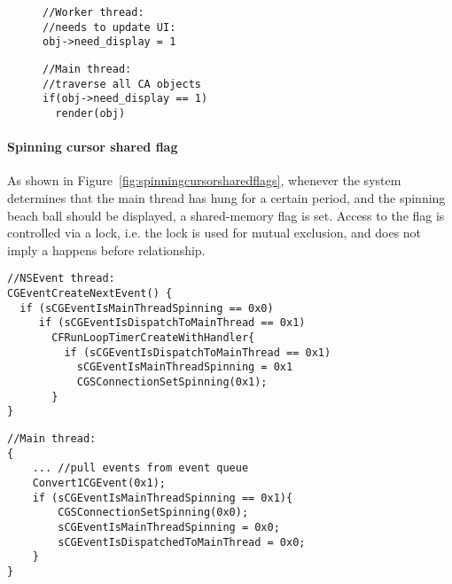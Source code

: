 \begin{figure}[ht!]
\begin{minipage}[t]{.20\textwidth}
\begin{lstlisting}
//Worker thread:
//needs to update UI:
obj->need_display = 1
\end{lstlisting}\hfill
\end{minipage}
\noindent\begin{minipage}[t]{.28\textwidth}
\begin{lstlisting}
//Main thread: 
//traverse all CA objects
if(obj->need_display == 1)
  render(obj)
\end{lstlisting}\hfill
\end{minipage}
    \label{fig:casharedflag}
\end{figure}

\paragraph{Spinning cursor shared flag}
As shown in Figure~\ref{fig:spinningcursorsharedflags},
whenever the system determines that the main thread has hung for a certain
period, and the spinning beach ball should be displayed, a shared-memory flag
is set. Access to the flag is controlled via a lock, i.e. the lock is used for
mutual exclusion, and does not imply a happens before relationship.

\begin{figure*}[ht!]
\begin{minipage}[t]{0.5\textwidth}
\begin{lstlisting}
//NSEvent thread:
CGEventCreateNextEvent() {
  if (sCGEventIsMainThreadSpinning == 0x0)
     if (sCGEventIsDispatchToMainThread == 0x1)
       CFRunLoopTimerCreateWithHandler{
         if (sCGEventIsDispatchToMainThread == 0x1)
           sCGEventIsMainThreadSpinning = 0x1
           CGSConnectionSetSpinning(0x1);
       }
}
\end{lstlisting}
\end{minipage}
\begin{minipage}[t]{0.4\textwidth}
\begin{lstlisting}
//Main thread:
{
	... //pull events from event queue
	Convert1CGEvent(0x1);
	if (sCGEventIsMainThreadSpinning == 0x1){
  		CGSConnectionSetSpinning(0x0);
  		sCGEventIsMainThreadSpinning = 0x0;
  		sCGEventIsDispatchedToMainThread = 0x0;
	}
}
\end{lstlisting}
\end{minipage}
    \caption{Spinning Cursor Shared Flags}
    \label{fig:spinningcursorsharedflags}
\end{figure*}
